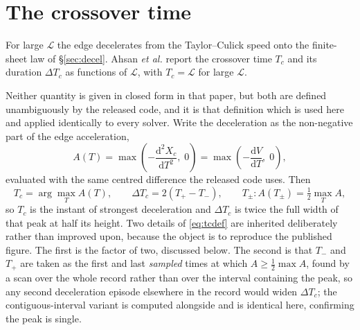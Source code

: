 \documentclass[11pt,a4paper]{article}
\newcommand{\Xc}{X_{c}}
\newcommand{\Tc}{T_{c}}
\begin{document}
\section{The crossover time}
\label{sec:tc}

For large $\mathcal{L}$ the edge decelerates from the Taylor--Culick speed onto
the finite-sheet law of \S\ref{sec:decel}. Ahsan \textit{et al.} \cite{ahsan2025} report the
crossover time $\Tc$ and its duration $\Delta \Tc$ as functions of
$\mathcal{L}$, with $\Tc = \mathcal{L}$ for large $\mathcal{L}$.

Neither quantity is given in closed form in that paper, but both are defined
unambiguously by the released code, and it is that definition which is used
here and applied identically to every solver. Write the deceleration as the
non-negative part of the edge acceleration,
%
\begin{equation}
  A(T) = \max\!\left(-\frac{\mathrm{d}^{2}\Xc}{\mathrm{d}T^{2}},\; 0\right)
       = \max\!\left(-\frac{\mathrm{d}V}{\mathrm{d}T},\; 0\right),
  \label{eq:decelfun}
\end{equation}
%
evaluated with the same centred difference the released code uses. Then
%
\begin{equation}
  \Tc = \arg\max_{T} A(T),
  \qquad
  \Delta \Tc = 2\left( T_{+} - T_{-}\right),
  \qquad
  T_{\pm} : A(T_{\pm}) = \tfrac{1}{2}\max_{T} A ,
  \label{eq:tcdef}
\end{equation}
%
so $\Tc$ is the instant of strongest deceleration and $\Delta \Tc$ is twice the
full width of that peak at half its height. Two details of
\eqref{eq:tcdef} are inherited deliberately rather than improved upon, because
the object is to reproduce the published figure. The first is the factor of
  two,
discussed below. The second is that $T_{-}$ and $T_{+}$ are taken as the first
and last \emph{sampled} times at which $A \ge \tfrac{1}{2}\max A$, found by a
scan over the whole record rather than over the interval containing the peak,
so any second deceleration episode elsewhere in the record would widen
$\Delta \Tc$; the contiguous-interval variant is computed alongside and is
identical here, confirming the peak is single.
\end{document}
